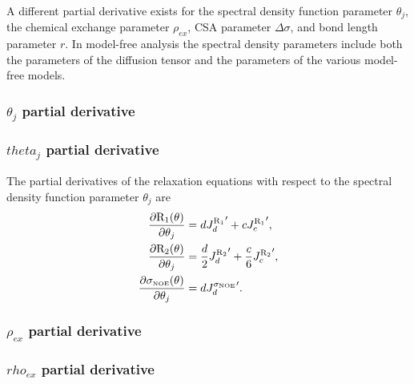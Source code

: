 A different partial derivative exists for the spectral density function parameter $\theta_j$, the chemical exchange parameter $\rho_{ex}$, CSA parameter $\Delta\sigma$, and bond length parameter $r$.
In model-free analysis the spectral density parameters include both the parameters of the diffusion tensor and the parameters of the various model-free models.


\begin{latexonly}
    \subsubsection{$\theta_j$ partial derivative}
\end{latexonly}
\begin{htmlonly}
    \subsubsection{$theta_j$ partial derivative}
\end{htmlonly}

The partial derivatives of the relaxation equations with respect to the spectral density function parameter $\theta_j$ are
\begin{subequations}
\begin{align}
    \frac{\partial \mathrm{R}_1(\theta)}{\partial \theta_j} &= d {J_d^{\mathrm{R}_1}}' + c {J_c^{\mathrm{R}_1}}',                      \label{eq: Ri': dR1/dmf} \\
    \frac{\partial \mathrm{R}_2(\theta)}{\partial \theta_j} &= \frac{d}{2} {J_d^{\mathrm{R}_2}}' + \frac{c}{6} {J_c^{\mathrm{R}_2}}',  \label{eq: Ri': dR2/dmf} \\
    \frac{\partial \sigma_{\scriptscriptstyle \mathrm{NOE}}(\theta)}{\partial \theta_j} &= d {J_d^{\sigma_{\scriptscriptstyle \mathrm{NOE}}}}'.                         \label{eq: Ri': dsigmaNOE/dmf}
\end{align}
\end{subequations}


\begin{latexonly}
    \subsubsection{$\rho_{ex}$ partial derivative}
\end{latexonly}
\begin{htmlonly}
    \subsubsection{$rho_{ex}$ partial derivative}
\end{htmlonly}

